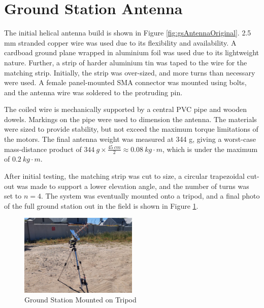 \graphicspath{{./figures}}

\section{Ground Station Antenna}

The initial helical antenna build is shown in Figure \ref{fig:gsAntennaOriginal}. 2.5 mm stranded copper wire was used due to its flexibility and availability. A cardboad ground plane wrapped in aluminium foil was used due to its lightweight nature. Further, a strip of harder aluminium tin was taped to the wire for the matching strip. Initially, the strip was over-sized, and more turns than necessary were used. A female panel-mounted SMA connector was mounted using bolts, and the antenna wire was soldered to the protruding pin.

The coiled wire is mechanically supported by a central PVC pipe and wooden dowels. Markings on the pipe were used to dimension the antenna. The materials were sized to provide stability, but not exceed the maximum torque limitations of the motors. The final antenna weight was measured at 344 g, giving a worst-case mass-distance product of $\SI{344}{g} \times \frac{\SI{45}{cm}}{2} \approx \SI{0.08}{kg \cdot m}$, which is under the maximum of $\SI{0.2}{kg \cdot m}$.

After initial testing, the matching strip was cut to size, a circular trapezoidal cut-out was made to support a lower elevation angle, and the number of turns was set to $n=4$. The system was eventually mounted onto a tripod, and a final photo of the full ground station out in the field is shown in Figure \ref{fig:gsTripod}.

\begin{figure}[!htb]
  \centering
  \includegraphics[width=0.5\textwidth]{gsTripod}
  \caption{Ground Station Mounted on Tripod}
  \label{fig:gsTripod}
\end{figure}